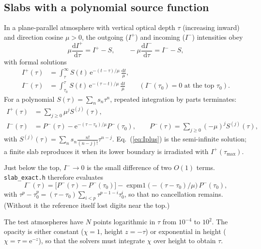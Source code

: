 \documentclass[11pt,a4paper]{article}
\newcommand{\code}[1]{\texttt{#1}}
\newcommand{\dd}{\mathrm{d}}
\newcommand{\e}{\mathrm{e}}
\begin{document}
\subsection{Slabs with a polynomial source function}
In a plane-parallel atmosphere with vertical optical depth $\tau$
(increasing inward) and direction cosine $\mu>0$, the outgoing
($I^+$) and incoming ($I^-$) intensities obey
\begin{equation}
\mu\frac{\dd I^+}{\dd\tau} = I^+ - S,\qquad
-\mu\frac{\dd I^-}{\dd\tau} = I^- - S,
\end{equation}
with formal solutions
\begin{align}
I^+(\tau) &= \int_\tau^\infty S(t)\,\e^{-(t-\tau)/\mu}\,\frac{\dd t}{\mu}, \\
I^-(\tau) &= \int_{\tau_0}^\tau S(t)\,\e^{-(\tau-t)/\mu}\,\frac{\dd t}{\mu}
  \qquad (I^-(\tau_0)=0 \text{ at the top } \tau_0).
\end{align}
For a polynomial $S(\tau) = \sum_n s_n\tau^n$, repeated integration by
parts terminates:
\begin{align}
I^+(\tau) &= \sum_{j\ge0}\mu^j S^{(j)}(\tau), \label{eq:Iplus}\\
I^-(\tau) &= P^-(\tau) - \e^{-(\tau-\tau_0)/\mu}P^-(\tau_0),\qquad
P^-(\tau) = \sum_{j\ge0}(-\mu)^jS^{(j)}(\tau), \label{eq:Iminus}
\end{align}
with $S^{(j)}(\tau) = \sum_n s_n\frac{n!}{(n-j)!}\tau^{n-j}$.
Eq.~(\ref{eq:Iplus}) is the semi-infinite solution; a finite slab
reproduces it when its lower boundary is irradiated with $I^+(\tau_\text{max})$.

Just below the top, $I^-\to0$ is the small difference of two $O(1)$
terms. \code{slab\_exact.h} therefore evaluates
\begin{equation}
I^-(\tau) = \bigl[P^-(\tau)-P^-(\tau_0)\bigr]
  - \operatorname{expm1}\bigl(-(\tau-\tau_0)/\mu\bigr)\,P^-(\tau_0),
\end{equation}
with $\tau^p-\tau_0^p = (\tau-\tau_0)\sum_{i<p}\tau^{p-1-i}\tau_0^i$, so
that no cancellation remains. (Without it the reference itself lost
digits near the top.)

The test atmospheres have $N$ points logarithmic in $\tau$ from
$10^{-4}$ to $10^2$. The opacity is either constant ($\chi=1$, height
$z=-\tau$) or exponential in height ($\chi=\tau=\e^{-z}$), so that the
solvers must integrate $\chi$ over height to obtain $\tau$.
\end{document}
